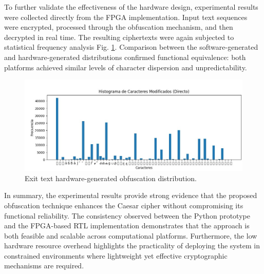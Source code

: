 \documentclass[journal,article,submit,pdftex,moreauthors]{Definitions/mdpi}
\begin{document}
To further validate the effectiveness of the hardware design, experimental results were collected directly from the FPGA implementation. Input text sequences were encrypted, processed through the obfuscation mechanism, and then decrypted in real time. The resulting ciphertexts were again subjected to statistical frequency analysis Fig. \ref{fig2}. Comparison between the software-generated and hardware-generated distributions confirmed functional equivalence: both platforms achieved similar levels of character dispersion and unpredictability.


\begin{figure}[H]
 \includegraphics[width=1\textwidth, height=5 cm]{imagenes/img2} %
\caption{Exit text hardware-generated obfuscation distribution.\label{fig2}}
\end{figure}   
\unskip

In summary, the experimental results provide strong evidence that the proposed obfuscation technique enhances the Caesar cipher without compromising its functional reliability. The consistency observed between the Python prototype and the FPGA-based RTL implementation demonstrates that the approach is both feasible and scalable across computational platforms. Furthermore, the low hardware resource overhead highlights the practicality of deploying the system in constrained environments where lightweight yet effective cryptographic mechanisms are required.










\appendixstart
\appendix
\end{document}
